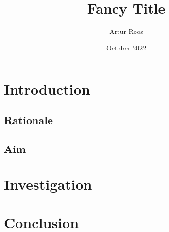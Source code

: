 \documentclass[12pt, titlepage]{article}
\title{Fancy Title}
\author{Artur Roos}
\date{October 2022}
\begin{document}
\maketitle

\section{Introduction}
\subsection{Rationale}
\subsection{Aim}
\section{Investigation}
\section{Conclusion}
\end{document}

